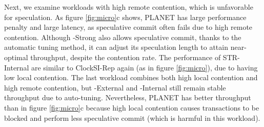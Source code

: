 Next, we examine workloads with high remote contention, which is unfavorable for speculation. As figure \ref{fig:micro}c shows, PLANET has large performance penalty and large latency, as speculative commit often fails due to high remote contention. Although {\specula}-Strong also allows speculative commit, thanks to the automatic tuning method, it can adjust its speculation length to attain near-optimal throughput, despite the contention rate. The performance of STR-Internal are similar to ClockSI-Rep again (as in figure \ref{fig:micro}), due to having low local contention. The last workload combines both high local contention and high remote contention, but {\specula}-External and {\specula}-Internal still remain stable throughput due to auto-tuning. Nevertheless, PLANET has better throughput than in figure \ref{fig:micro}c because high local contention causes transactions to be blocked and perform less speculative commit (which is harmful in this workload).


